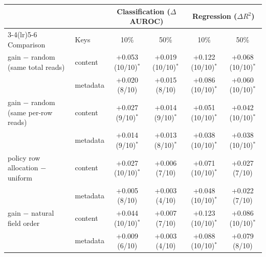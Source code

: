 \begin{tabular}{@{}llcccc@{}}
\toprule
 & & \multicolumn{2}{c}{Classification ($\Delta$AUROC)} & \multicolumn{2}{c}{Regression ($\Delta R^2$)} \\
\cmidrule(lr){3-4}\cmidrule(lr){5-6}
Comparison & Keys & 10\% & 50\% & 10\% & 50\% \\
\midrule
gain $-$ random (same total reads) & content & +0.053 (10/10)$^{*}$ & +0.019 (10/10)$^{*}$ & +0.122 (10/10)$^{*}$ & +0.068 (10/10)$^{*}$ \\
 & metadata & +0.020 (8/10) & +0.015 (8/10) & +0.086 (10/10)$^{*}$ & +0.060 (10/10)$^{*}$ \\
\midrule
gain $-$ random (same per-row reads) & content & +0.027 (9/10)$^{*}$ & +0.014 (9/10)$^{*}$ & +0.051 (10/10)$^{*}$ & +0.042 (10/10)$^{*}$ \\
 & metadata & +0.014 (9/10)$^{*}$ & +0.013 (8/10)$^{*}$ & +0.038 (10/10)$^{*}$ & +0.038 (10/10)$^{*}$ \\
\midrule
policy row allocation $-$ uniform & content & +0.027 (10/10)$^{*}$ & +0.006 (7/10) & +0.071 (10/10)$^{*}$ & +0.027 (7/10) \\
 & metadata & +0.005 (8/10) & +0.003 (4/10) & +0.048 (10/10)$^{*}$ & +0.022 (7/10) \\
\midrule
gain $-$ natural field order & content & +0.044 (10/10)$^{*}$ & +0.007 (7/10) & +0.123 (10/10)$^{*}$ & +0.086 (10/10)$^{*}$ \\
 & metadata & +0.009 (6/10) & +0.003 (4/10) & +0.088 (10/10)$^{*}$ & +0.079 (8/10) \\
\bottomrule
\end{tabular}
